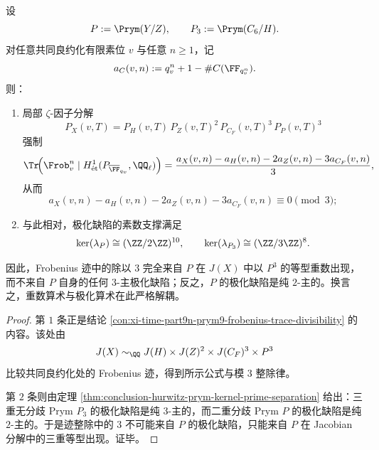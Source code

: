\begin{theorem}\label{thm:conclusion-prym-multiplicity-polarization-prime-decoupling}
设
\[
P:=\Prym(Y/Z),
\qquad
P_3:=\Prym(C_6/H).
\]
对任意共同良约化有限素位 \(v\) 与任意 \(n\ge 1\)，记
\[
a_C(v,n):=q_v^n+1-\#C(\FF_{q_v^n}).
\]
则：
\begin{enumerate}
  \item 局部 \(\zeta\)-因子分解
  \[
  P_X(v,T)=P_H(v,T)\,P_Z(v,T)^2\,P_{C_F}(v,T)^3\,P_P(v,T)^3
  \]
  强制
  \[
  \Tr\!\Bigl(\Frob_v^n\mid H^1_{\text{ét}}(P_{\overline{\FF}_{q_v}},\QQ_\ell)\Bigr)
  =
  \frac{a_X(v,n)-a_H(v,n)-2a_Z(v,n)-3a_{C_F}(v,n)}{3},
  \]
  从而
  \[
  a_X(v,n)-a_H(v,n)-2a_Z(v,n)-3a_{C_F}(v,n)\equiv 0\pmod 3;
  \]
  \item 与此相对，极化缺陷的素数支撑满足
  \[
  \ker(\lambda_{P})\cong (\ZZ/2\ZZ)^{10},
  \qquad
  \ker(\lambda_{P_3})\cong (\ZZ/3\ZZ)^8.
  \]
\end{enumerate}
因此，Frobenius 迹中的除以 \(3\) 完全来自 \(P\) 在 \(J(X)\) 中以 \(P^3\) 的等型重数出现，而不来自 \(P\) 自身的任何 \(3\)-主极化缺陷；反之，\(P\) 的极化缺陷是纯 \(2\)-主的。换言之，重数算术与极化算术在此严格解耦。
\end{theorem}
\begin{proof}
第 \(1\) 条正是结论 \ref{con:xi-time-part9n-prym9-frobenius-trace-divisibility} 的内容。该处由
\[
J(X)\sim_{\QQ}J(H)\times J(Z)^2\times J(C_F)^3\times P^3
\]
比较共同良约化处的 Frobenius 迹，得到所示公式与模 \(3\) 整除律。

第 \(2\) 条则由定理 \ref{thm:conclusion-hurwitz-prym-kernel-prime-separation} 给出：三重无分歧 Prym \(P_3\) 的极化缺陷是纯 \(3\)-主的，而二重分歧 Prym \(P\) 的极化缺陷是纯 \(2\)-主的。于是迹整除中的 \(3\) 不可能来自 \(P\) 的极化缺陷，只能来自 \(P\) 在 Jacobian 分解中的三重等型出现。证毕。
\end{proof}

